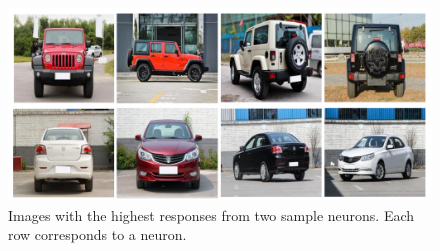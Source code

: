 \documentclass[10pt,twocolumn,letterpaper]{article}
\begin{document}
%
%
%

\begin{figure}[t]\centering
\includegraphics[width=1\linewidth]{response.pdf}
\caption{Images with the highest responses from two sample neurons. Each row corresponds to a neuron.}
\label{fig:response}
\vskip -0.35cm
\end{figure}
\end{document}
